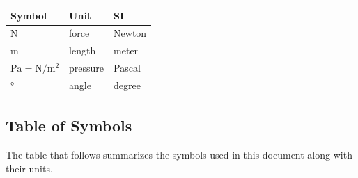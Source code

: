 \documentclass[12pt]{article}
\renewcommand{\arraystretch}{1}
\begin{document}
\renewcommand{\arraystretch}{1.2}
\setlength{\tabcolsep}{20pt}
\begin{tabular}{  l  l  l  }
\hline
\textbf{Symbol} & \textbf{Unit} & \textbf{SI} \\
\hline
\si{\newton} & force & Newton \\
\si{\meter} & length & meter \\
$\si{\pascal}=\si{\newton\per\square\meter}$ & pressure & Pascal \\
\si{\degree} & angle & degree  \\
\hline
\end{tabular}
\renewcommand{\arraystretch}{1}



\subsection{Table of Symbols}


The table that follows summarizes the symbols used in this document along with 
their units. 
\end{document}
